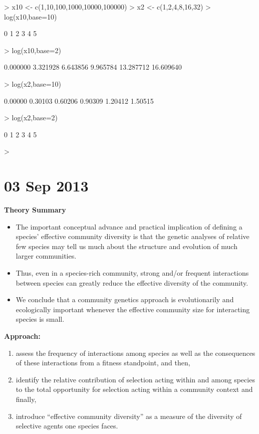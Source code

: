 \documentclass[12pt]{article}
\begin{document}
\begin{Schunk}
\begin{Sinput}
> x10 <- c(1,10,100,1000,10000,100000)
> x2 <- c(1,2,4,8,16,32)
> log(x10,base=10)
\end{Sinput}
\begin{Soutput}
[1] 0 1 2 3 4 5
\end{Soutput}
\begin{Sinput}
> log(x10,base=2)
\end{Sinput}
\begin{Soutput}
[1]  0.000000  3.321928  6.643856  9.965784 13.287712 16.609640
\end{Soutput}
\begin{Sinput}
> log(x2,base=10)
\end{Sinput}
\begin{Soutput}
[1] 0.00000 0.30103 0.60206 0.90309 1.20412 1.50515
\end{Soutput}
\begin{Sinput}
> log(x2,base=2)
\end{Sinput}
\begin{Soutput}
[1] 0 1 2 3 4 5
\end{Soutput}
\begin{Sinput}
> 
\end{Sinput}
\end{Schunk}


\section{03 Sep 2013}

\textbf{Theory Summary}
\begin{itemize}
\item The important conceptual advance and practical implication of
  defining a species’ effective community diversity is that the
  genetic analyses of relative few species may tell us much about the
  structure and evolution of much larger communities.  
\item Thus, even in a species-rich community, strong and/or frequent
  interactions between species can greatly reduce the effective
  diversity of the community.  
\item We conclude that a community genetics approach is evolutionarily
  and ecologically important whenever the effective community size for
  interacting species is small.
\end{itemize}

\textbf{Approach:}

\begin{enumerate}
\item assess the frequency of interactions among species as well as
  the consequences of these interactions from a fitness standpoint,
  and then, 
\item identify the relative contribution of selection acting within
  and among species to the total opportunity for selection acting
  within a community context and finally, 
\item introduce “effective community diversity” as a measure of the
diversity of selective agents one species faces.  
\end{enumerate}
\end{document}
